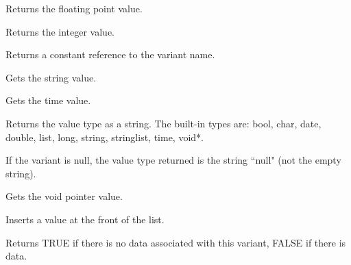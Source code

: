 
Returns the floating point value.

\label{wxvariantgetlong}


Returns the integer value.

\label{wxvariantgetname}


Returns a constant reference to the variant name.

\label{wxvariantgetstring}


Gets the string value.

\label{wxvariantgettime}


Gets the time value.

\label{wxvariantgettype}


Returns the value type as a string. The built-in types are: bool, char, date, double, list, long, string, stringlist, time, void*.

If the variant is null, the value type returned is the string ``null" (not the empty string).

\label{wxvariantgetvoidptr}


Gets the void pointer value.

\label{wxvariantinsert}


Inserts a value at the front of the list.

\label{wxvariantisnull}


Returns TRUE if there is no data associated with this variant, FALSE if there is data.

\label{wxvariantistype}


